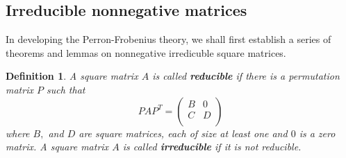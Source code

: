 \documentclass[a4paper,11pt]{report}
\newtheorem{definition}[theorem]{Definition}
\begin{document}
\subsection{Irreducible nonnegative matrices}
In developing the Perron-Frobenius theory, we shall first establish a series of 
theorems and lemmas on nonnegative irredicuble square matrices. 
\begin{definition}\label{defreduciebel} A square matrix $A$ is called \textbf{reducible} if there is a permutation matrix $P$ such that 
 $$PAP^T = \begin{pmatrix}  B  & 0\\
 C  & D\\
\end{pmatrix} $$
where $B,$ and $D$ are square matrices, each of size at least one and $0$ is a zero matrix.
A square matrix $A$ is called \textbf{irreducible} if it is not reducible.
 \end{definition}
\end{document}
